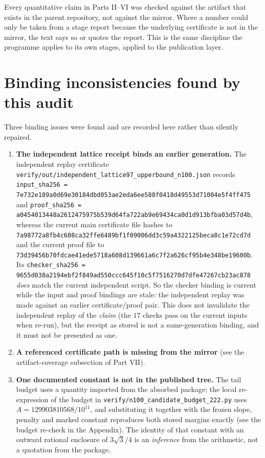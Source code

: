 \begin{remark}
Every quantitative claim in Parts II--VI was checked against the artifact that exists in the parent
repository, not against the mirror. Where a number could only be taken from a stage report because
the underlying certificate is not in the mirror, the text says so or quotes the report. This is the
same discipline the programme applies to its own stages, applied to the publication layer.
\end{remark}

\section{Binding inconsistencies found by this audit}

Three binding issues were found and are recorded here rather than silently repaired.

\begin{enumerate}[leftmargin=1.6em,itemsep=3pt]
\item \textbf{The independent lattice receipt binds an earlier generation.} The independent replay
certificate {\footnotesize\texttt{verify/\allowbreak{}out/\allowbreak{}independent\_\allowbreak{}lattice97\_\allowbreak{}upperbound\_\allowbreak{}n100.json}} records
{\footnotesize\texttt{input\_\allowbreak{}sha256 = 7e732e189a0d69e30184dbd053ae2eda6ee588f0418d49553d71004e5f4ff475}} and
{\footnotesize\texttt{proof\_\allowbreak{}sha256 = a0454013448a2612475975b539d64fa722ab9e69434ca0d1d913bfba03d57d4b}}, whereas the
current main certificate file hashes to
{\footnotesize\texttt{7a98772a8fb4c608ca32ffe6489bf1f09006dd3c59a4322125beca8c1e72cd7d}} and the current proof file to
{\footnotesize\texttt{73d39456b70fdcae41ede5718a608d139661a6c7f2a626cf95b4e348be19600b}}. Its
{\footnotesize\texttt{checker\_\allowbreak{}sha256 = 9655d038a2194ebf2f849ad550ccc645f10c5f7516270d7dfe47267cb23ac878}} \emph{does}
match the current independent script. So the checker binding is current while the input and proof
bindings are stale: the independent replay was made against an earlier certificate/proof pair. This
does not invalidate the independent replay of the \emph{claim} (the $17$ checks pass on the current
inputs when re-run), but the receipt as stored is not a same-generation binding, and it must not be
presented as one.
\item \textbf{A referenced certificate path is missing from the mirror} (see the artifact-coverage subsection of Part VII).
\item \textbf{One documented constant is not in the published tree.} The tail budget uses a quantity
imported from the absorbed package; the local re-expression of the budget in
\texttt{verify/\allowbreak{}n100\_\allowbreak{}candidate\_\allowbreak{}budget\_\allowbreak{}222.py} uses
$A=129903810568/10^{11}$, and substituting it together with the frozen slope, penalty and marked
constant reproduces both stored margins exactly (see the budget re-check in the Appendix). The identity of
that constant with an outward rational enclosure of $3\sqrt3/4$ is an \emph{inference} from the
arithmetic, not a quotation from the package.
\end{enumerate}

